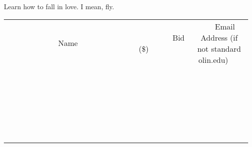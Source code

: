 \documentclass[11pt]{article}
\begin{document}
Learn how to fall in love. I mean, fly.
\\[6ex]
\begin{tabular}{c c c}
~~~~~~~~~~~~~Name~~~~~~~~~~~~~ & ~~~~~~~~~Bid (\$)~~~~~~~~~  & ~~~Email Address (if not standard olin.edu)~~~\\
 & & \\
\hline
 & & \\
\hline
 & & \\
\hline
 & & \\
\hline
 & & \\
\hline
 & & \\
\hline
 & & \\
\hline
 & & \\
\hline
 & & \\
\hline
 & & \\
\hline
 & & \\
\hline
 & & \\
\hline
 & & \\
\hline
 & & \\
\hline
 & & \\
\hline
 & & \\
\hline
 & & \\
\hline
 & & \\
\hline
 & & \\
\hline
 & & \\
\hline
 & & \\
\hline
 & & \\
\hline
 & & \\
\hline
 & & \\
\hline
 & & \\
\hline
 & & \\
\hline
\end{tabular}
\newpage
\end{document}
